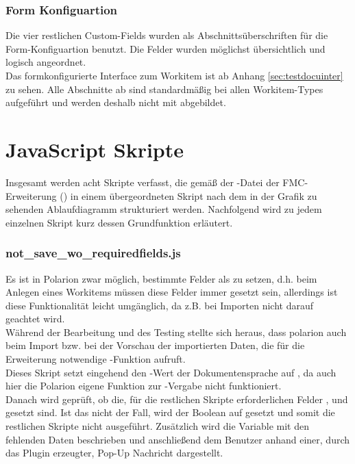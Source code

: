 \subsubsection{Form Konfiguartion}
\label{sub:formconfig}
Die vier restlichen Custom-Fields wurden als Abschnittsüberschriften für die Form-Konfiguartion benutzt. Die Felder wurden möglichst übersichtlich und logisch angeordnet.
\\
Das formkonfigurierte Interface zum Workitem  ist ab Anhang \ref{sec:testdocuinter} zu sehen. 
Alle Abschnitte ab  sind standardmäßig bei allen Workitem-Types aufgeführt und werden deshalb nicht mit abgebildet.
\newpage
\section{JavaScript Skripte}
\label{ses:javascripts}
Insgesamt werden acht Skripte verfasst, die gemäß der -Datei der FMC-Erweiterung (\cite{8}) in einem übergeordneten Skript  nach dem in der Grafik zu sehenden Ablaufdiagramm strukturiert werden.
%
%
Nachfolgend wird zu jedem einzelnen Skript kurz dessen Grundfunktion erläutert.
\subsubsection{not\_save\_wo\_requiredfields.js}
\label{sub:notsavewo}
Es ist in Polarion zwar möglich, bestimmte Felder als  zu setzen, d.h. beim Anlegen eines Workitems müssen diese Felder immer gesetzt sein, allerdings ist diese Funktionalität leicht umgänglich, da z.B. bei Importen nicht darauf geachtet wird. \\
Während der Bearbeitung und des Testing stellte sich heraus, dass polarion auch beim Import bzw. bei der Vorschau der importierten Daten, die für die Erweiterung notwendige -Funktion aufruft. \\
Dieses Skript setzt eingehend den -Wert der Dokumentensprache auf , da auch hier die Polarion eigene Funktion zur -Vergabe nicht funktioniert.\\
Danach wird geprüft, ob die, für die restlichen Skripte erforderlichen Felder ,  und  gesetzt sind. Ist das nicht der Fall, wird der Boolean  auf  gesetzt und somit die restlichen Skripte nicht ausgeführt.
Zusätzlich wird die Variable  mit den fehlenden Daten beschrieben und anschließend dem Benutzer anhand einer, durch das Plugin erzeugter, Pop-Up Nachricht dargestellt.
